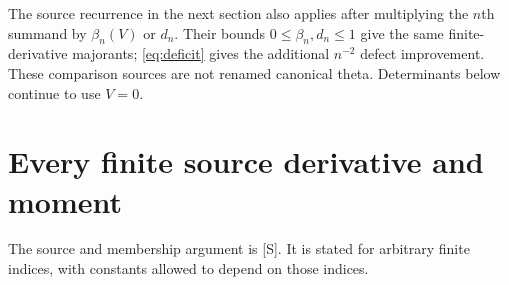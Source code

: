\documentclass[11pt,letterpaper]{article}
\numberwithin{equation}{section}
\theoremstyle{remark}
\newcommand{\evid}[1]{\textsf{[#1]}}
\begin{document}
The source recurrence in the next section also applies after
multiplying the \(n\)th summand by \(\beta_n(V)\) or \(d_n\).
Their bounds \(0\le\beta_n,d_n\le1\) give the same finite-derivative
majorants; \eqref{eq:deficit} gives the additional \(n^{-2}\)
defect improvement. These comparison sources are not renamed
canonical theta. Determinants below continue to use \(V=0\).

\section{Every finite source derivative and moment}
\label{sec:source}

The source and membership argument is \evid{S}. It is stated for
arbitrary finite indices, with constants allowed to depend on those
indices.
\end{document}
